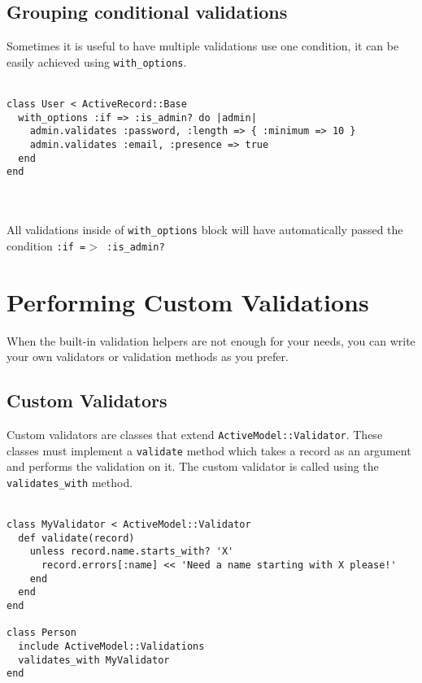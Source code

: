 \documentclass[10pt]{book}
\begin{document}
\subsection{ Grouping conditional validations}

Sometimes it is useful to have multiple validations use one condition, it can be easily achieved using \texttt{with\_options}.
\\ \\
\begin{minipage}{\textwidth}{\scriptsize
\begin{verbatim}
class User < ActiveRecord::Base
  with_options :if => :is_admin? do |admin|
    admin.validates :password, :length => { :minimum => 10 }
    admin.validates :email, :presence => true
  end
end
\end{verbatim}}
\end{minipage}
\\ \\

All validations inside of \texttt{with\_options} block will have automatically passed the condition \texttt{:if =$>$ :is\_admin?}

\section{ Performing Custom Validations}

When the built-in validation helpers are not enough for your needs,  you can write your own validators or validation methods as you prefer.

\subsection{ Custom Validators}

Custom validators are classes that extend \texttt{ActiveModel::Validator}. These classes must implement a \texttt{validate} method which takes a record as an argument and performs the validation on it. The custom validator is called using the \texttt{validates\_with} method.
\\ \\
\begin{minipage}{\textwidth}{\scriptsize
\begin{verbatim}
class MyValidator < ActiveModel::Validator
  def validate(record)
    unless record.name.starts_with? 'X'
      record.errors[:name] << 'Need a name starting with X please!'
    end
  end
end
 
class Person
  include ActiveModel::Validations
  validates_with MyValidator
end
\end{verbatim}}
\end{minipage}
\\ \\
\end{document}
